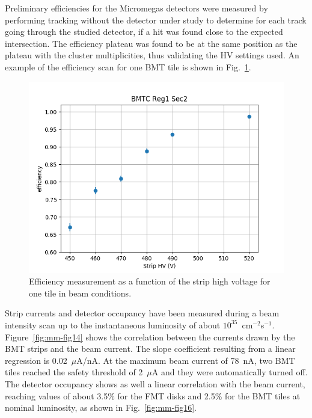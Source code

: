 Preliminary efficiencies for the Micromegas detectors were measured by performing tracking without the detector under study
to determine for each track going through the studied detector, if a hit was found close to the expected intersection. The
efficiency plateau was found to be at the same position as the plateau with the cluster multiplicities, thus validating the HV
settings used. An example of the efficiency scan for one BMT tile is shown in Fig.~\ref{fig:mm-eff_scan}.

\begin{figure}[htb]
 \includegraphics[width=1.0\columnwidth,keepaspectratio]{images/hvscan_BMTC_R1_S2.png}
 \caption{Efficiency measurement as a function of the strip high voltage for one tile in beam conditions.}
 \label{fig:mm-eff_scan}
\end{figure}

Strip currents and detector occupancy have been measured during a beam intensity scan up to the instantaneous luminosity of
about $10^{35}$~cm$^{-2}$s$^{-1}$. Figure~\ref{fig:mm-fig14} shows the correlation between the currents drawn by the BMT
strips and the beam current. The slope coefficient resulting from a linear regression is 0.02~$\mu$A/nA. At the maximum
beam current of 78~nA, two BMT tiles reached the safety threshold of 2~$\mu$A and they were automatically turned off. The
detector occupancy shows as well a linear correlation with the beam current, reaching values of about 3.5\% for the FMT disks
and 2.5\% for the BMT tiles at nominal luminosity, as shown in Fig.~\ref{fig:mm-fig16}.


